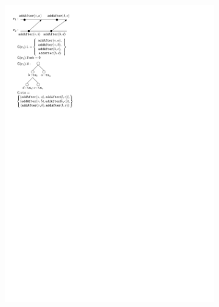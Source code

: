 \begin{figure}[t]
\begin{subfigure}[!ht]{.3\linewidth}
      \includegraphics[scale=.7]{figures/LinRGA-2}
      \vspace{1cm}
    \caption{}
    \label{fig:rga-sem-2}
  \end{subfigure}
  \begin{subfigure}[!ht]{.3\linewidth}

\end{subfigure}
\end{figure}
